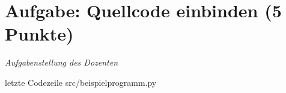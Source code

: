 
\newcommand{\dozent}{Prof. Dr. Claudia Müller-Birn, Barry Linnert}					%
\newcommand{\tutor}{Thierry Meurers}						%
\newcommand{\tutoriumNo}{10}				%
\newcommand{\ubungNo}{01}									%
\newcommand{\veranstaltung}{Objektorientierte Programmierung}	%
\newcommand{\semester}{SoSo 17}						%
\newcommand{\studenten}{Stefaan Hessmann, Jaap Pedersen, Mark Niehues}			%




\section{Aufgabe: Quellcode einbinden \hfill (5 Punkte)}
{\itshape Aufgabenstellung des Dozenten}

 letzte Codezeile
{src/beispielprogramm.py}

